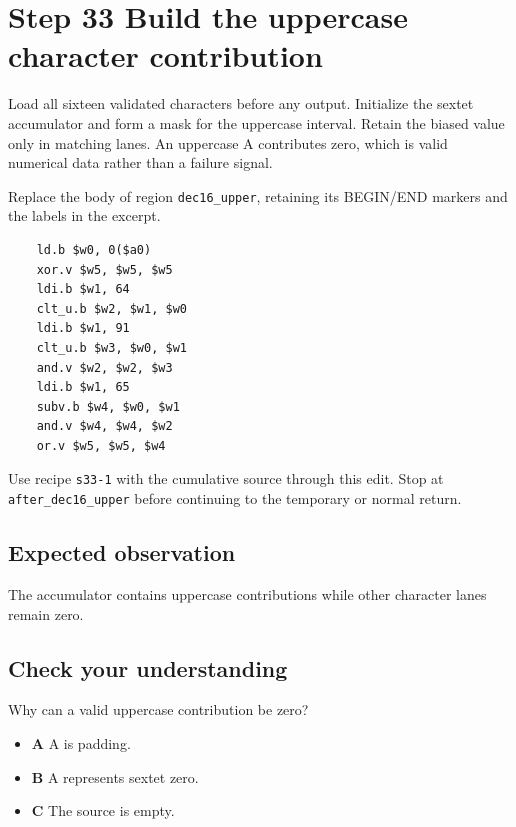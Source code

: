 \section{Step 33 Build the uppercase character contribution}\label{base64-s33}

Load all sixteen validated characters before any output. Initialize the sextet accumulator and form a mask for the uppercase interval. Retain the biased value only in matching lanes. An uppercase A contributes zero, which is valid numerical data rather than a failure signal.

Replace the body of region \texttt{dec16\_upper}, retaining its BEGIN/END markers and the labels in the excerpt.

\begin{verbatim}
    ld.b $w0, 0($a0)
    xor.v $w5, $w5, $w5
    ldi.b $w1, 64
    clt_u.b $w2, $w1, $w0
    ldi.b $w1, 91
    clt_u.b $w3, $w0, $w1
    and.v $w2, $w2, $w3
    ldi.b $w1, 65
    subv.b $w4, $w0, $w1
    and.v $w4, $w4, $w2
    or.v $w5, $w5, $w4
\end{verbatim}

Use recipe \texttt{s33-1} with the cumulative source through this edit. Stop at \texttt{after\_dec16\_upper} before continuing to the temporary or normal return.

\subsection{Expected observation}
The accumulator contains uppercase contributions while other character lanes remain zero.

\subsection{Check your understanding}
Why can a valid uppercase contribution be zero?

\begin{itemize}
  \item \textbf{A} A is padding.
  \item \textbf{B} A represents sextet zero.
  \item \textbf{C} The source is empty.
\end{itemize}
